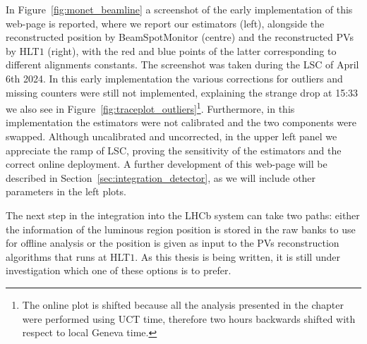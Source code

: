 In Figure~\ref{fig:monet_beamline} a screenshot of the early implementation of this web-page is reported, where we report our estimators (left), alongside the reconstructed position by BeamSpotMonitor (centre) and the reconstructed PVs by HLT$1$ (right), with the red and blue points of the latter corresponding to different alignments constants. The screenshot was taken during the LSC of April 6th 2024. In this early implementation the various corrections for outliers and missing counters were still not implemented, explaining the strange drop at 15:33 we also see in Figure~\ref{fig:traceplot_outliers}\footnote{The online plot is shifted because all the analysis presented in the chapter were performed using UCT time, therefore two hours backwards shifted with respect to local Geneva time.}. Furthermore, in this implementation the estimators were not calibrated and the two components were swapped. Although uncalibrated and uncorrected, in the upper left panel we appreciate the ramp of LSC, proving the sensitivity of the estimators and the correct online deployment.
A further development of this web-page will be described in Section~\ref{sec:integration_detector}, as we will include other parameters in the left plots.

The next step in the integration into the LHCb system can take two paths: either the information of the luminous region position is stored in the raw banks to use for offline analysis or the position is given as input to the PVs reconstruction algorithms that runs at HLT$1$. As this thesis is being written, it is still under investigation which one of these options is to prefer.